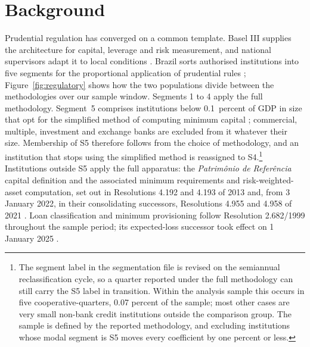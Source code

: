 \documentclass[11pt,a4paper]{article}
\begin{document}
\section{Background}

Prudential regulation has converged on a common template. Basel III supplies the
architecture for capital, leverage and risk measurement, and national supervisors adapt
it to local conditions \citep{bcbs2011}. Brazil sorts authorised institutions into five
segments for the proportional application of prudential rules \citep{cmn4553};
Figure~\ref{fig:regulatory} shows how the two populations divide between the
methodologies over our sample window. Segments 1 to 4 apply the full methodology.
Segment~5 comprises institutions below 0.1~percent of GDP in size that opt for the
simplified method of computing minimum capital \citep{cmn4606}; commercial, multiple,
investment and exchange banks are excluded from it whatever their size. Membership of S5
therefore follows from the choice of methodology, and an institution that stops using the
simplified method is reassigned to S4.\footnote{The segment label in the segmentation
file is revised on the semiannual reclassification cycle, so a quarter reported under the
full methodology can still carry the S5 label in transition. Within the analysis sample
this occurs in five cooperative-quarters, 0.07 percent of the sample; most other cases
are very small non-bank credit institutions outside the comparison group. The sample is
defined by the reported methodology, and excluding institutions whose modal segment is S5
moves every coefficient by one percent or less.} Institutions outside S5 apply the full
apparatus: the \textit{Patrim\^onio de Refer\^encia} capital definition and the
associated minimum requirements and risk-weighted-asset computation, set out in
Resolutions 4.192 and 4.193 of 2013 and, from 3 January 2022, in their consolidating
successors, Resolutions 4.955 and 4.958 of 2021 \citep{cmn4192, cmn4193, cmn4955,
cmn4958}. Loan classification and minimum provisioning follow Resolution 2.682/1999
throughout the sample period; its expected-loss successor took effect on 1 January 2025
\citep{cmn2682, cmn4966}.
\end{document}
